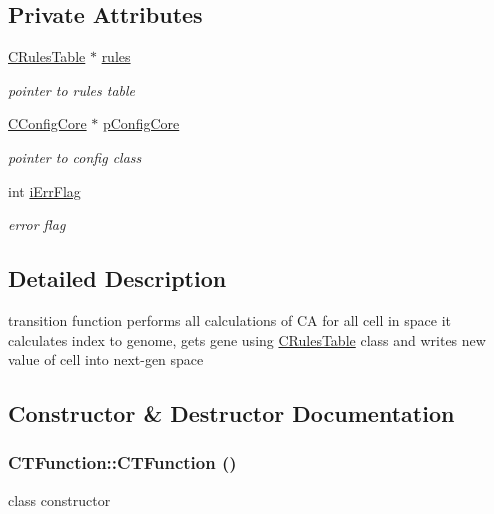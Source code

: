 \subsection*{Private Attributes}
\begin{DoxyCompactItemize}
\item 
\hypertarget{classCTFunction_a72ea1bfa7803e5751d6249bfbf8c7d90}{
\hyperlink{classCRulesTable}{CRulesTable} $\ast$ \hyperlink{classCTFunction_a72ea1bfa7803e5751d6249bfbf8c7d90}{rules}}
\label{classCTFunction_a72ea1bfa7803e5751d6249bfbf8c7d90}

\begin{DoxyCompactList}\small\item\em pointer to rules table \item\end{DoxyCompactList}\item 
\hypertarget{classCTFunction_ae5a61d8280f85a3fa4804b22d6fcdfd0}{
\hyperlink{classCConfigCore}{CConfigCore} $\ast$ \hyperlink{classCTFunction_ae5a61d8280f85a3fa4804b22d6fcdfd0}{pConfigCore}}
\label{classCTFunction_ae5a61d8280f85a3fa4804b22d6fcdfd0}

\begin{DoxyCompactList}\small\item\em pointer to config class \item\end{DoxyCompactList}\item 
\hypertarget{classCTFunction_a84a79b8b4aa3d09537e5900de355e63d}{
int \hyperlink{classCTFunction_a84a79b8b4aa3d09537e5900de355e63d}{iErrFlag}}
\label{classCTFunction_a84a79b8b4aa3d09537e5900de355e63d}

\begin{DoxyCompactList}\small\item\em error flag \item\end{DoxyCompactList}\end{DoxyCompactItemize}


\subsection{Detailed Description}
transition function performs all calculations of CA for all cell in space it calculates index to genome, gets gene using \hyperlink{classCRulesTable}{CRulesTable} class and writes new value of cell into next-\/gen space 

\subsection{Constructor \& Destructor Documentation}
\hypertarget{classCTFunction_a85e48f0a80f493d3e6144f3ed4058ede}{
\subsubsection[{CTFunction}]{\setlength{\rightskip}{0pt plus 5cm}CTFunction::CTFunction ()}}
\label{classCTFunction_a85e48f0a80f493d3e6144f3ed4058ede}
class constructor 

